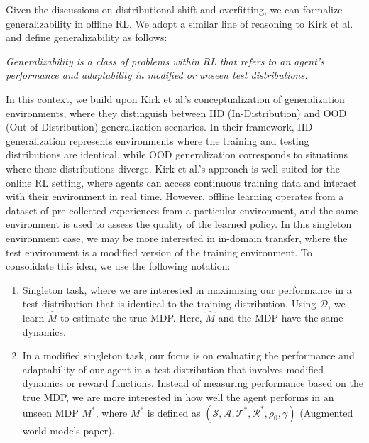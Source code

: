 Given the discussions on distributional shift and overfitting, we can formalize generalizability in offline RL. We adopt a similar line of reasoning to Kirk et al. and define generalizability as follows:

\begin{flushleft}
    \textit{Generalizability is a class of problems within RL that refers to an agent’s performance and adaptability in modified or unseen test distributions. }
\end{flushleft}

In this context, we build upon Kirk et al.’s conceptualization of generalization environments, where they distinguish between IID (In-Distribution) and OOD (Out-of-Distribution) generalization scenarios. In their framework, IID generalization represents environments where the training and testing distributions are identical, while OOD generalization corresponds to situations where these distributions diverge. Kirk et al.’s approach is well-suited for the online RL setting, where agents can access continuous training data and interact with their environment in real time. However, offline learning operates from a dataset of pre-collected experiences from a particular environment, and the same environment is used to assess the quality of the learned policy. In this singleton environment case, we may be more interested in in-domain transfer, where the test environment is a modified version of the training environment. To consolidate this idea, we use the following notation:

\begin{enumerate}
    \item Singleton task, where we are interested in maximizing our performance in a test distribution that is identical to the training distribution. Using \(\mathcal{D}\), we learn \(\hat{M}\) to estimate the true MDP. Here, \(\hat{M}\) and the MDP have the same dynamics.
    \item In a modified singleton task, our focus is on evaluating the performance and adaptability of our agent in a test distribution that involves modified dynamics or reward functions. Instead of measuring performance based on the true MDP, we are more interested in how well the agent performs in an unseen MDP \({M}^*\), where \({M}^*\) is defined as \((\mathcal{S}, \mathcal{A}, \mathcal{T}^*, \mathcal{R}^*, \rho_0, \gamma)\) (Augmented world models paper).
\end{enumerate}



